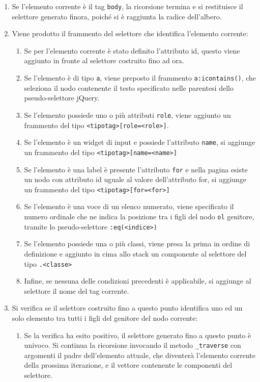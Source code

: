 \begin{enumerate}
\item Se l'elemento corrente è il tag \verb|body|, la ricorsione termina e si restituisce il selettore generato finora, poiché si è raggiunta la radice dell'albero.
\item Viene prodotto il frammento del selettore che identifica l'elemento corrente:
	\begin{enumerate}
		\item Se per l'elemento corrente è stato definito l'attributo id, questo viene aggiunto  in fronte al selettore costruito fino ad ora.
		\item Se l'elemento è di tipo \verb|a|, viene preposto il frammento \verb|a:icontains()|, che seleziona il nodo contenente il testo specificato nelle parentesi dello pseudo-selettore jQuery.
		\item Se l'elemento possiede uno o più attributi \verb|role|, viene aggiunto un frammento del tipo \verb|<tipotag>[role=<role>]|.
		\item Se l'elemento è un widget di input e possiede l'attributo \verb|name|, si aggiunge un frammento del tipo \verb|<tipotag>[name=<name>]|
		\item Se l'elemento è una label è presente l'attributo \verb|for| e nella pagina esiste un nodo con attributo id uguale al valore dell'attributo for, si aggiunge un frammento del tipo \verb|<tipotag>[for=<for>]| 
		\item Se l'elemento è una voce di un elenco numerato, viene specificato il numero ordinale che ne indica la posizione tra i figli del nodo \verb|ol| genitore, tramite lo pseudo-selettore \verb|:eq(<indice>)|
		\item Se l'elemento possiede una o più classi, viene presa la prima in ordine di definizione e aggiunto in cima allo stack un componente al selettore del tipo \verb|.<classe>|
		\item Infine, se nessuna delle condizioni precedenti è applicabile, si aggiunge al selettore il nome del tag corrente.
	\end{enumerate}
\item Si verifica se il selettore costruito fino a questo punto identifica uno ed un solo elemento tra tutti i figli del genitore del nodo corrente:
	\begin{enumerate}
		\item Se la verifica ha esito positivo, il selettore generato fino a questo punto è univoco. Si continua la ricorsione invocando il metodo \verb|_traverse| con argomenti il padre dell'elemento attuale, che diventerà l'elemento corrente della prossima iterazione, e il vettore contenente le componenti del selettore.

\end{enumerate}
\end{enumerate}
